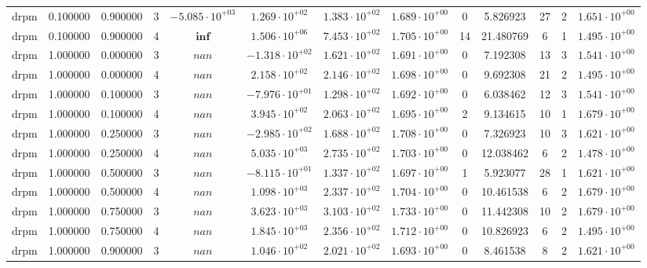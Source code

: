 \begin{table}
\begin{tabular}{ccccccccccccc}
drpm & 0.100000 & 0.900000 & 3 & $-5.085 \cdot 10^{+03}$ & $1.269 \cdot 10^{+02}$ & $1.383 \cdot 10^{+02}$ & $1.689 \cdot 10^{+00}$ & 0 & 5.826923 & 27 & 2 & $1.651 \cdot 10^{+00}$ \\
drpm & 0.100000 & 0.900000 & 4 & $\mathbf{inf}$ & $1.506 \cdot 10^{+06}$ & $7.453 \cdot 10^{+02}$ & $1.705 \cdot 10^{+00}$ & 14 & 21.480769 & 6 & 1 & $1.495 \cdot 10^{+00}$ \\
drpm & 1.000000 & 0.000000 & 3 & $nan$ & $-1.318 \cdot 10^{+02}$ & $1.621 \cdot 10^{+02}$ & $1.691 \cdot 10^{+00}$ & 0 & 7.192308 & 13 & 3 & $1.541 \cdot 10^{+00}$ \\
drpm & 1.000000 & 0.000000 & 4 & $nan$ & $2.158 \cdot 10^{+02}$ & $2.146 \cdot 10^{+02}$ & $1.698 \cdot 10^{+00}$ & 0 & 9.692308 & 21 & 2 & $1.495 \cdot 10^{+00}$ \\
drpm & 1.000000 & 0.100000 & 3 & $nan$ & $-7.976 \cdot 10^{+01}$ & $1.298 \cdot 10^{+02}$ & $1.692 \cdot 10^{+00}$ & 0 & 6.038462 & 12 & 3 & $1.541 \cdot 10^{+00}$ \\
drpm & 1.000000 & 0.100000 & 4 & $nan$ & $3.945 \cdot 10^{+02}$ & $2.063 \cdot 10^{+02}$ & $1.695 \cdot 10^{+00}$ & 2 & 9.134615 & 10 & 1 & $1.679 \cdot 10^{+00}$ \\
drpm & 1.000000 & 0.250000 & 3 & $nan$ & $-2.985 \cdot 10^{+02}$ & $1.688 \cdot 10^{+02}$ & $1.708 \cdot 10^{+00}$ & 0 & 7.326923 & 10 & 3 & $1.621 \cdot 10^{+00}$ \\
drpm & 1.000000 & 0.250000 & 4 & $nan$ & $5.035 \cdot 10^{+03}$ & $2.735 \cdot 10^{+02}$ & $1.703 \cdot 10^{+00}$ & 0 & 12.038462 & 6 & 2 & $1.478 \cdot 10^{+00}$ \\
drpm & 1.000000 & 0.500000 & 3 & $nan$ & $-8.115 \cdot 10^{+01}$ & $1.337 \cdot 10^{+02}$ & $1.697 \cdot 10^{+00}$ & 1 & 5.923077 & 28 & 1 & $1.621 \cdot 10^{+00}$ \\
drpm & 1.000000 & 0.500000 & 4 & $nan$ & $1.098 \cdot 10^{+03}$ & $2.337 \cdot 10^{+02}$ & $1.704 \cdot 10^{+00}$ & 0 & 10.461538 & 6 & 2 & $1.679 \cdot 10^{+00}$ \\
drpm & 1.000000 & 0.750000 & 3 & $nan$ & $3.623 \cdot 10^{+03}$ & $3.103 \cdot 10^{+02}$ & $1.733 \cdot 10^{+00}$ & 0 & 11.442308 & 10 & 2 & $1.679 \cdot 10^{+00}$ \\
drpm & 1.000000 & 0.750000 & 4 & $nan$ & $1.845 \cdot 10^{+03}$ & $2.356 \cdot 10^{+02}$ & $1.712 \cdot 10^{+00}$ & 0 & 10.826923 & 6 & 2 & $1.495 \cdot 10^{+00}$ \\
drpm & 1.000000 & 0.900000 & 3 & $nan$ & $1.046 \cdot 10^{+02}$ & $2.021 \cdot 10^{+02}$ & $1.693 \cdot 10^{+00}$ & 0 & 8.461538 & 8 & 2 & $1.621 \cdot 10^{+00}$ \\

\end{tabular}
\end{table}
